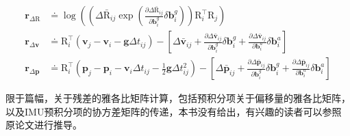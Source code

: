 \begin{equation}
\begin{aligned}
  \bm{r}_{\Delta\mathrm{R}}
    &\doteq
      \log\left(
        \left(
          \Delta\bar{\mathrm R}_{ij}
          \exp\left(
            \frac{\partial\Delta\bar{\mathrm R}_{ij}}{\partial\bm{b}^g_i}
            \delta\bm{b}^g_i\right)
        \right) \mathrm{R}^\top_i \mathrm{R}_j
      \right) \\
  \bm{r}_{\Delta\bm{v}}
    &\doteq
      \mathrm{R}^\top_i(\bm{v}_j - \bm{v}_i - \bm{g}\Delta t_{ij}) -
      \left[
        \Delta\bar{\bm v}_{ij} +
        \tfrac{\partial\Delta\bar{\bm v}_{ij}}{\partial\bm{b}^g_i}
        \delta\bm{b}^g_i +
        \tfrac{\partial\Delta\bar{\bm v}_{ij}}{\partial\bm{b}^a_i}
        \delta\bm{b}^a_i
      \right] \\
  \bm{r}_{\Delta\bm{p}}
    &\doteq
      \mathrm{R}^\top_i(
        \bm{p}_j - \bm{p}_i -
        \bm{v}_i \Delta t_{ij} -
        \frac{1}{2}\bm{g}\Delta t^2_{ij}) -
      \left[
        \Delta\bar{\bm p}_{ij} +
        \tfrac{\partial\Delta\bar{\bm p}_{ij}}{\partial\bm{b}^g_i}
        \delta\bm{b}^g_i +
        \tfrac{\partial\Delta\bar{\bm p}_{ij}}{\partial\bm{b}^a_i}
        \delta\bm{b}^a_i \right]
\end{aligned}
\end{equation}

限于篇幅，关于残差的雅各比矩阵计算，包括预积分项关于偏移量的雅各比矩阵，以及IMU预积分项的协方差矩阵的传递，本书没有给出，有兴趣的读者可以参照原论文进行推导。

